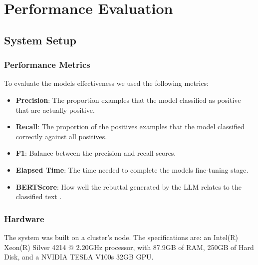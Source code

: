 \section{Performance Evaluation}
\subsection{System Setup}
\subsubsection{Performance Metrics}
To evaluate the models effectiveness we used the following metrics:

\begin{itemize}
	\item{\textbf{Precision}}:  The proportion  examples that the model classified as positive that are actually positive. 
	\item{\textbf{Recall}}:  The proportion of the positives examples that the model classified correctly against all positives.
	\item{\textbf{F1}}: Balance between the precision and recall scores.
	\item{\textbf{Elapsed Time}}: The time needed to complete the models fine-tuning stage.
	\item{\textbf{BERTScore}}: How well the rebuttal generated by the LLM relates to the classified text \cite{zhang2020bertscoreevaluatingtextgeneration}.
\end{itemize}

\subsubsection{Hardware}
The system was built on a cluster's node. The specifications are: an Intel(R) Xeon(R) Silver 4214 @ 2.20GHz processor, with 87.9GB of RAM, 250GB of Hard Disk, and a NVIDIA TESLA V100s 32GB GPU.

